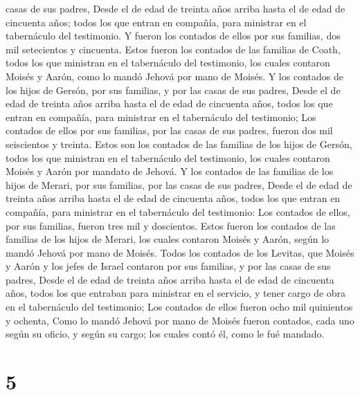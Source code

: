 casas de sus padres,  Desde el de edad de treinta años
arriba hasta el de edad de cincuenta años; todos los que entran en
compañía, para ministrar en el tabernáculo del testimonio. 
Y fueron los contados de ellos por sus familias, dos mil setecientos y
cincuenta.  Estos fueron los contados de las familias de
Coath, todos los que ministran en el tabernáculo del testimonio, los
cuales contaron Moisés y Aarón, como lo mandó Jehová por mano de Moisés.
 Y los contados de los hijos de Gersón, por sus familias, y
por las casas de sus padres,  Desde el de edad de treinta
años arriba hasta el de edad de cincuenta años, todos los que entran en
compañía, para ministrar en el tabernáculo del testimonio; 
Los contados de ellos por sus familias, por las casas de sus padres,
fueron dos mil seiscientos y treinta.  Estos son los
contados de las familias de los hijos de Gersón, todos los que ministran
en el tabernáculo del testimonio, los cuales contaron Moisés y Aarón por
mandato de Jehová.  Y los contados de las familias de los
hijos de Merari, por sus familias, por las casas de sus padres,
 Desde el de edad de treinta años arriba hasta el de edad
de cincuenta años, todos los que entran en compañía, para ministrar en
el tabernáculo del testimonio:  Los contados de ellos, por
sus familias, fueron tres mil y doscientos.  Estos fueron
los contados de las familias de los hijos de Merari, los cuales contaron
Moisés y Aarón, según lo mandó Jehová por mano de Moisés. 
Todos los contados de los Levitas, que Moisés y Aarón y los jefes de
Israel contaron por sus familias, y por las casas de sus padres,
 Desde el de edad de treinta años arriba hasta el de edad
de cincuenta años, todos los que entraban para ministrar en el servicio,
y tener cargo de obra en el tabernáculo del testimonio; 
Los contados de ellos fueron ocho mil quinientos y ochenta,
 Como lo mandó Jehová por mano de Moisés fueron contados,
cada uno según su oficio, y según su cargo; los cuales contó él, como le
fué mandado.

\hypertarget{section-4}{%
\section{5}\label{section-4}}

